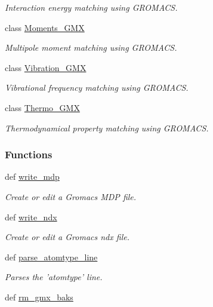\begin{DoxyCompactItemize}
\begin{DoxyCompactList}\small\item\em Interaction energy matching using G\-R\-O\-M\-A\-C\-S. \end{DoxyCompactList}\item 
class \hyperlink{classforcebalance_1_1gmxio_1_1Moments__GMX}{Moments\-\_\-\-G\-M\-X}
\begin{DoxyCompactList}\small\item\em Multipole moment matching using G\-R\-O\-M\-A\-C\-S. \end{DoxyCompactList}\item 
class \hyperlink{classforcebalance_1_1gmxio_1_1Vibration__GMX}{Vibration\-\_\-\-G\-M\-X}
\begin{DoxyCompactList}\small\item\em Vibrational frequency matching using G\-R\-O\-M\-A\-C\-S. \end{DoxyCompactList}\item 
class \hyperlink{classforcebalance_1_1gmxio_1_1Thermo__GMX}{Thermo\-\_\-\-G\-M\-X}
\begin{DoxyCompactList}\small\item\em Thermodynamical property matching using G\-R\-O\-M\-A\-C\-S. \end{DoxyCompactList}\end{DoxyCompactItemize}
\subsubsection*{Functions}
\begin{DoxyCompactItemize}
\item 
def \hyperlink{namespaceforcebalance_1_1gmxio_a73a881531c27adfddab62cda7f2232cd}{write\-\_\-mdp}
\begin{DoxyCompactList}\small\item\em Create or edit a Gromacs M\-D\-P file. \end{DoxyCompactList}\item 
def \hyperlink{namespaceforcebalance_1_1gmxio_a02c974d03c4ac22f6169593dc0d812da}{write\-\_\-ndx}
\begin{DoxyCompactList}\small\item\em Create or edit a Gromacs ndx file. \end{DoxyCompactList}\item 
def \hyperlink{namespaceforcebalance_1_1gmxio_a29af6ace00d7e58258e0a854ca13d954}{parse\-\_\-atomtype\-\_\-line}
\begin{DoxyCompactList}\small\item\em Parses the 'atomtype' line. \end{DoxyCompactList}\item 
def \hyperlink{namespaceforcebalance_1_1gmxio_acac8488f29b62fb0d4cb54bb5a041026}{rm\-\_\-gmx\-\_\-baks}
\end{DoxyCompactItemize}
